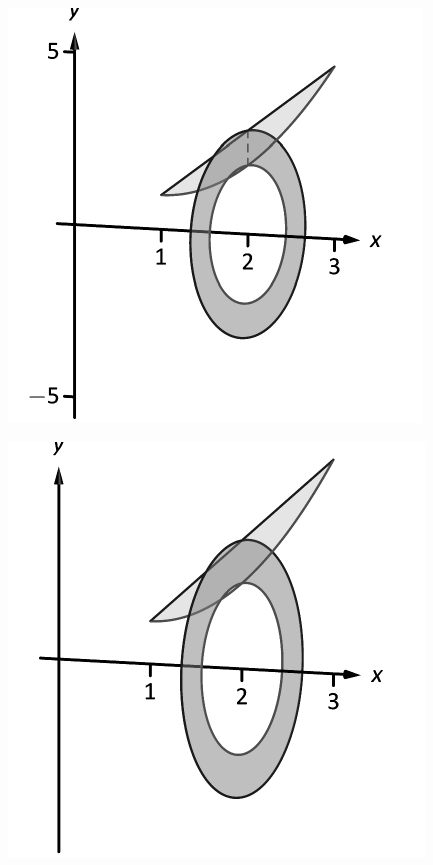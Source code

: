 \documentclass[10pt]{article}
\begin{document}
\includegraphics{figwash1c_3DBW.pdf}
\texttt{}

\includegraphics{figwash2_3DBW.pdf}
\texttt{}
\end{document}

